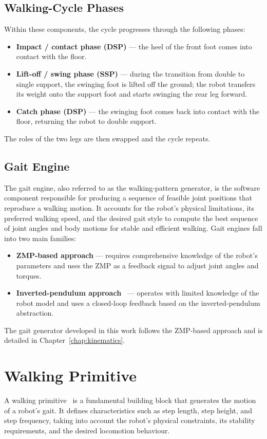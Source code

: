 \subsection{Walking-Cycle Phases}
Within these components, the cycle progresses through the following
phases:
\begin{itemize}[itemsep=2pt,topsep=4pt]
  \item \textbf{Impact / contact phase (DSP)} --- the heel of the front
        foot comes into contact with the floor.
  \item \textbf{Lift-off / swing phase (SSP)} --- during the transition
        from double to single support, the swinging foot is lifted off
        the ground; the robot transfers its weight onto the support foot
        and starts swinging the rear leg forward.
  \item \textbf{Catch phase (DSP)} --- the swinging foot comes back into
        contact with the floor, returning the robot to double support.
\end{itemize}
The roles of the two legs are then swapped and the cycle repeats.

\subsection{Gait Engine}
The gait engine, also referred to as the walking-pattern generator, is
the software component responsible for producing a sequence of feasible
joint positions that reproduce a walking motion. It accounts for the
robot's physical limitations, its preferred walking speed, and the
desired gait style to compute the best sequence of joint angles and body
motions for stable and efficient walking. Gait engines fall into two
main families:
\begin{itemize}[itemsep=2pt,topsep=4pt]
  \item \textbf{ZMP-based approach} --- requires comprehensive knowledge
        of the robot's parameters and uses the ZMP as a feedback signal
        to adjust joint angles and torques.
  \item \textbf{Inverted-pendulum approach}~\cite{shahbazi2016} --- operates
        with limited knowledge of the robot model and uses a closed-loop
        feedback based on the inverted-pendulum abstraction.
\end{itemize}
The gait generator developed in this work follows the ZMP-based approach
and is detailed in Chapter~\ref{chap:kinematics}.

\section{Walking Primitive}
A walking primitive~\cite{hauser2008} is a fundamental building block that
generates the motion of a robot's gait. It defines characteristics such as step
length, step height, and step frequency, taking into account the robot's
physical constraints, its stability requirements, and the desired
locomotion behaviour.

